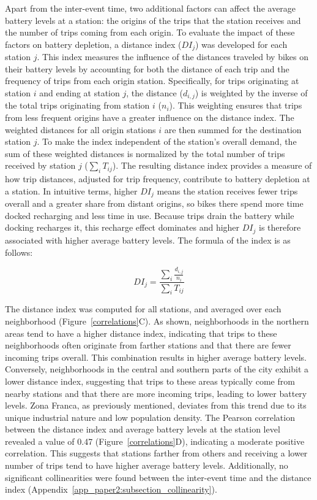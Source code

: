         Apart from the inter-event time, two additional factors can affect the average battery levels at a station: the origins of the trips that the station receives and the number of trips coming from each origin. To evaluate the impact of these factors on battery depletion, a distance index (\(DI_j\)) was developed for each station \( j \). This index measures the influence of the distances traveled by bikes on their battery levels by accounting for both the distance of each trip and the frequency of trips from each origin station. Specifically, for trips originating at station \( i \) and ending at station \( j \), the distance  (\( d_{i,j} \)) is weighted by the inverse of the total trips originating from station \( i \) (\( n_i \)). This weighting ensures that trips from less frequent origins have a greater influence on the distance index. The weighted distances for all origin stations \( i \) are then summed for the destination station \( j \). To make the index independent of the station’s overall demand, the sum of these weighted distances is normalized by the total number of trips received by station \( j \) (\( \sum_{i} T_{ij} \)). The resulting distance index provides a measure of how trip distances, adjusted for trip frequency, contribute to battery depletion at a station. In intuitive terms, higher \(DI_j\) means the station receives fewer trips overall and a greater share from distant origins, so bikes there spend more time docked recharging and less time in use. Because trips drain the battery while docking recharges it, this recharge effect dominates and higher \(DI_j\) is therefore associated with higher average battery levels. The formula of the index is as follows:

        \begin{equation}
          DI_j = \frac{\sum_{i} \frac{d_{i,j}}{n_i}}{\sum_{i} T_{ij}}
        \end{equation}

        The distance index was computed for all stations, and averaged over each neighborhood (Figure~\ref{correlations}C). As shown, neighborhoods in the northern areas tend to have a higher distance index, indicating that trips to these neighborhoods often originate from farther stations and that there are fewer incoming trips overall. This combination results in higher average battery levels. Conversely, neighborhoods in the central and southern parts of the city exhibit a lower distance index, suggesting that trips to these areas typically come from nearby stations and that there are more incoming trips, leading to lower battery levels. Zona Franca, as previously mentioned, deviates from this trend due to its unique industrial nature and low population density. The Pearson correlation between the distance index and average battery levels at the station level revealed a value of 0.47 (Figure~\ref{correlations}D), indicating a moderate positive correlation. This suggests that stations farther from others and receiving a lower number of trips tend to have higher average battery levels. Additionally, no significant collinearities were found between the inter-event time and the distance index (Appendix~\ref{app_paper2:subsection_collinearity}).



